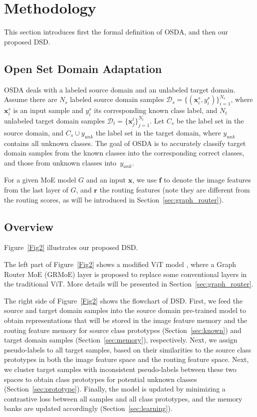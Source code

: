 \documentclass[10pt,twocolumn,letterpaper]{article}
\begin{document}
\section{Methodology}

This section introduces first the formal definition of OSDA, and then our proposed DSD.

\subsection{Open Set Domain Adaptation}

OSDA deals with a labeled source domain and an unlabeled target domain. Assume there are $N_s$ labeled source domain samples $\mathcal{D}_s = \{(\bm{x}_i^s, y_i^s)\}_{i=1}^{N_s}$, where $\bm{x}_i^s$ is an input sample and $y_i^s$ its corresponding known class label, and $N_t$ unlabeled target domain samples $\mathcal{D}_t=\{\bm{x}_j^t\}_{j=1}^{N_t}$. Let $C_s$ be the label set in the source domain, and $C_s \cup y_{unk}$ the label set in the target domain, where $y_{unk}$ contains all unknown classes. The goal of OSDA is to accurately classify target domain samples from the known classes into the corresponding correct classes, and those from unknown classes into~$y_{unk}$.

For a given MoE model $G$ and an input $\bm{x}$, we use $\bm{f}$ to denote the image features from the last layer of $G$, and $\bm{r}$ the routing features (note they are different from the routing scores, as will be introduced in Section~\ref{sec:graph_router}).

\subsection{Overview}

Figure~\ref{Fig2} illustrates our proposed DSD.

The left part of Figure~\ref{Fig2} shows a modified ViT model \cite{dosovitskiy2021an}, where a Graph Router MoE (GRMoE) layer is proposed to replace some conventional layers in the traditional ViT. More details will be presented in Section~\ref{sec:graph_router}.

The right side of Figure~\ref{Fig2} shows the flowchart of DSD. First, we feed the source and target domain samples into the source domain pre-trained model to obtain representations that will be stored in the image feature memory and the routing feature memory for source class prototypes (Section~\ref{sec:known}) and target domain samples (Section~\ref{sec:memory}), respectively. Next, we assign pseudo-labels to all target samples, based on their similarities to the source class prototypes in both the image feature space and the routing feature space. Next, we cluster target samples with inconsistent pseudo-labels between these two spaces to obtain class prototypes for potential unknown classes (Section~\ref{sec:prototype}). Finally, the model is updated by minimizing a contrastive loss between all  samples and all class prototypes, and the memory banks are updated accordingly (Section~\ref{sec:learning}).
\end{document}
